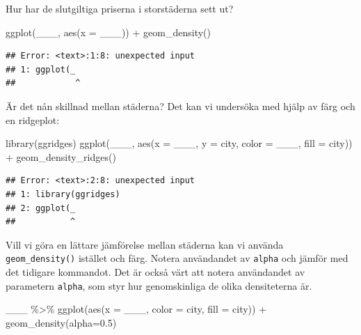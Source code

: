 \documentclass[
]{book}
\newenvironment{Shaded}{\begin{snugshade}}{\end{snugshade}}
\newcommand{\AttributeTok}[1]{\textcolor[rgb]{0.77,0.63,0.00}{#1}}
\newcommand{\FloatTok}[1]{\textcolor[rgb]{0.00,0.00,0.81}{#1}}
\newcommand{\FunctionTok}[1]{\textcolor[rgb]{0.00,0.00,0.00}{#1}}
\newcommand{\NormalTok}[1]{#1}
\newcommand{\SpecialCharTok}[1]{\textcolor[rgb]{0.00,0.00,0.00}{#1}}
\begin{document}
Hur har de slutgiltiga priserna i storstäderna sett ut?

\begin{Shaded}
\begin{Highlighting}[]
\FunctionTok{ggplot}\NormalTok{(\_\_\_, }
          \FunctionTok{aes}\NormalTok{(}\AttributeTok{x =}\NormalTok{ \_\_\_)) }\SpecialCharTok{+}
  \FunctionTok{geom\_density}\NormalTok{()}
\end{Highlighting}
\end{Shaded}

\begin{verbatim}
## Error: <text>:1:8: unexpected input
## 1: ggplot(_
##            ^
\end{verbatim}

Är det nån skillnad mellan städerna? Det kan vi undersöka med hjälp av färg och en ridgeplot:

\begin{Shaded}
\begin{Highlighting}[]
\FunctionTok{library}\NormalTok{(ggridges)}
\FunctionTok{ggplot}\NormalTok{(\_\_\_, }
          \FunctionTok{aes}\NormalTok{(}\AttributeTok{x =}\NormalTok{ \_\_\_, }
              \AttributeTok{y =}\NormalTok{ city,}
              \AttributeTok{color =}\NormalTok{ \_\_\_,}
              \AttributeTok{fill =}\NormalTok{ city)) }\SpecialCharTok{+} \FunctionTok{geom\_density\_ridges}\NormalTok{()}
\end{Highlighting}
\end{Shaded}

\begin{verbatim}
## Error: <text>:2:8: unexpected input
## 1: library(ggridges)
## 2: ggplot(_
##           ^
\end{verbatim}

Vill vi göra en lättare jämförelse mellan städerna kan vi använda \texttt{geom\_density()} istället och färg. Notera användandet av \texttt{alpha} och jämför med det tidigare kommandot. Det är också värt att notera användandet av parametern \texttt{alpha}, som styr hur genomskinliga de olika densiteterna är.

\begin{Shaded}
\begin{Highlighting}[]
\NormalTok{\_\_\_ }\SpecialCharTok{\%\textgreater{}\%} \FunctionTok{ggplot}\NormalTok{(}\FunctionTok{aes}\NormalTok{(}\AttributeTok{x =}\NormalTok{ \_\_\_,}
                            \AttributeTok{color =}\NormalTok{ city, }
                            \AttributeTok{fill =}\NormalTok{ city)) }\SpecialCharTok{+}
  \FunctionTok{geom\_density}\NormalTok{(}\AttributeTok{alpha=}\FloatTok{0.5}\NormalTok{)}
\end{Highlighting}
\end{Shaded}
\end{document}
